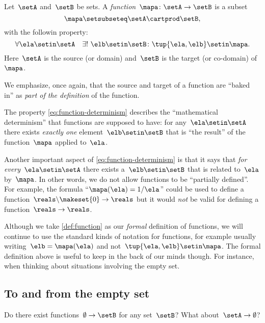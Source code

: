 \begin{ctdefinition}[Function]
    \label{def:function}
    Let~$\setA$ and~$\setB$ be sets.
    A \emph{function}~$\mapa\colon \setA \to \setB$ is a subset
    \begin{equation*}
        \mapa \setsubseteq \setA \cartprod \setB,
    \end{equation*}
    with the followin property:
    \begin{equation}
        \label{eq:function-determinism}
        \forall \ela \setin\setA  \quad  \exists !
        \ \elb \setin\setB \colon \tup{\ela,\elb} \setin\mapa.
    \end{equation}
    Here~$\setA$ is the source (or domain) and~$\setB$ is the target (or co-domain) of~$\mapa$.
\end{ctdefinition}

We emphasize, once again, that the source and target of a function are ``baked in'' as \emph{part of the definition} of the function.

The property \cref{eq:function-determinism} describes the ``mathematical determinism'' that functions are supposed to have: for any~$\ela \setin\setA$ there exists \emph{exactly one} element~$\elb \setin\setB$ that is ``the result'' of the function~$\mapa$ applied to~$\ela$.

Another important aspect of \cref{eq:function-determinism} is that it says that \emph{for every}~$\ela \setin\setA$ there exists a~$\elb \setin\setB$ that is related to~$\ela$ by~$\mapa$.
In other words, we do not allow functions to be ``partially defined''.
For example, the formula ``$\mapa(\ela) = 1/ \ela$'' could be used to define a function~$\reals \backslash \makeset{ 0 } \to \reals$ but it would \emph{not} be valid for defining a function~$\reals \to \reals$.

Although we take \cref{def:function} as our \emph{formal} definition of functions, we will continue to use the standard kinds of notation for functions, for example usually writing~$\elb = \mapa(\ela)$ and not~$\tup{\ela, \elb} \setin\mapa$.
The formal definition above is useful to keep in the back of our minds though.
For instance, when thinking about situations involving the empty set.

\subsection{To and from the empty set}

Do there exist functions~$\emptyset \to \setB$ for any set~$\setB$?
What about~$\setA \to \emptyset$?

